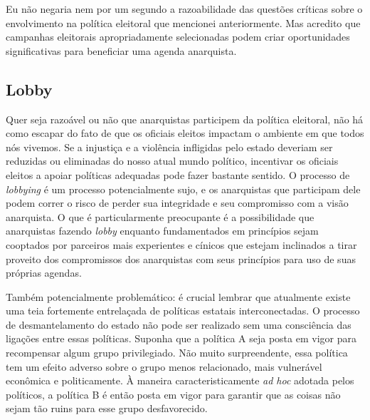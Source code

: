 Eu não negaria nem por um segundo a razoabilidade das questões críticas sobre o envolvimento na política eleitoral que mencionei anteriormente. Mas acredito que campanhas eleitorais apropriadamente selecionadas podem criar oportunidades significativas para beneficiar uma agenda anarquista.

\subsection*{Lobby}

Quer seja razoável ou não que anarquistas participem da política eleitoral, não há como escapar do fato de que os oficiais eleitos impactam o ambiente em que todos nós vivemos. Se a injustiça e a violência infligidas pelo estado deveriam ser reduzidas ou eliminadas do nosso atual mundo político, incentivar os oficiais eleitos a apoiar políticas adequadas pode fazer bastante sentido. O processo de \emph{lobbying} é um processo potencialmente sujo, e os anarquistas que participam dele podem correr o risco de perder sua integridade e seu compromisso com a visão anarquista. O que é particularmente preocupante é a possibilidade que anarquistas fazendo \emph{lobby} enquanto fundamentados em princípios sejam cooptados por parceiros mais experientes e cínicos que estejam inclinados a tirar proveito dos compromissos dos anarquistas com seus princípios para uso de suas próprias agendas.

Também potencialmente problemático: é crucial lembrar que atualmente existe uma teia fortemente entrelaçada de políticas estatais interconectadas. O processo de desmantelamento do estado não pode ser realizado sem uma consciência das ligações entre essas políticas. Suponha que a política A seja posta em vigor para recompensar algum grupo privilegiado. Não muito surpreendente, essa política tem um efeito adverso sobre o grupo menos relacionado, mais vulnerável econômica e politicamente. À maneira caracteristicamente \emph{ad hoc} adotada pelos políticos, a política B é então posta em vigor para garantir que as coisas não sejam tão ruins para esse grupo desfavorecido.

